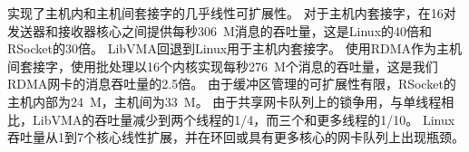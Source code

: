 



\sys 实现了主机内和主机间套接字的几乎线性可扩展性。
对于主机内套接字，\sys 在16对发送器和接收器核心之间提供每秒306~M消息的吞吐量，这是Linux的40倍和RSocket的30倍。
LibVMA回退到Linux用于主机内套接字。
使用RDMA作为主机间套接字，\sys 使用批处理以16个内核实现每秒276~M个消息的吞吐量，这是我们RDMA网卡的消息吞吐量的2.5倍。
由于缓冲区管理的可扩展性有限，RSocket的主机内部为24~M，主机间为33~M。
由于共享网卡队列上的锁争用，与单线程相比，LibVMA的吞吐量减少到两个线程的1/4，而三个和更多线程的1/10。
Linux吞吐量从1到7个核心线性扩展，并在环回或具有更多核心的网卡队列上出现瓶颈。



